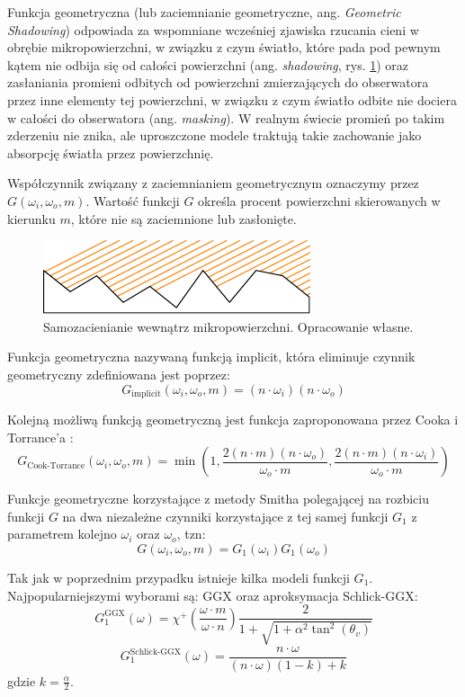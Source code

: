 \documentclass[../main.tex]{subfiles}
\begin{document}
Funkcja geometryczna (lub zaciemnianie geometryczne, ang. \textit{Geometric
Shadowing}) odpowiada za wspomniane wcześniej zjawiska rzucania cieni w obrębie
mikropowierzchni, w związku z czym światło, które pada pod pewnym kątem nie
odbija się od całości powierzchni (ang. \textit{shadowing}, rys.
\ref{fig:GeometricShadowing}) oraz zasłaniania promieni odbitych od powierzchni
zmierzających do obserwatora przez inne elementy tej powierzchni, w związku z
czym światło odbite nie dociera w całości do obserwatora (ang.
\textit{masking}). W realnym świecie promień po takim zderzeniu nie znika, ale
uproszczone modele traktują takie zachowanie jako absorpcję światła przez
powierzchnię.

Współczynnik związany z zaciemnianiem geometrycznym oznaczymy przez $G(\omega_i,\omega_o,m)$.
Wartość funkcji $G$ określa procent powierzchni skierowanych w kierunku
$m$, które nie są zaciemnione lub zasłonięte.

\begin{figure}[h]
  \centering
  \includegraphics{illustrations/pbr/geometry_shadowing.pdf}
  \vspace{0.25cm}
  \caption{Samozacienianie wewnątrz mikropowierzchni. Opracowanie własne.}
  \label{fig:GeometricShadowing}
\end{figure}

Funkcja geometryczna nazywaną funkcją implicit, która eliminuje czynnik geometryczny zdefiniowana jest poprzez:
\[
  G_{\text{implicit}}(\omega_i, \omega_o, m) =
    (n \cdot \omega_i) (n \cdot \omega_o)
\]

Kolejną możliwą funkcją geometryczną jest funkcja zaproponowana przez Cooka i Torrance'a \cite{CookTorrance}:
\[
  G_{\text{Cook-Torrance}}(\omega_i,\omega_o,m) =
    \min \left(
      1,
      \frac{2(n \cdot m)(n \cdot \omega_o)}{
        \omega_o \cdot m
      },
      \frac{2(n \cdot m)(n \cdot \omega_i)}{
        \omega_o \cdot m
      }
    \right)
\]

Funkcje geometryczne korzystające z metody Smitha polegającej na rozbiciu
funkcji $G$ na dwa niezależne czynniki korzystające z tej samej funkcji $G_1$
z parametrem kolejno $\omega_i$ oraz $\omega_o$, tzn:
\[
  G(\omega_i, \omega_o, m) = G_1(\omega_i) G_1(\omega_o)
\]

Tak jak w poprzednim przypadku istnieje kilka modeli funkcji $G_1$.
Najpopularniejszymi wyborami są: GGX \cite{WalterMicrofacetModels} oraz aproksymacja Schlick-GGX:
\[
  G_{1}^{\text{GGX}}(\omega) =
    \chi^{+}\left(\frac{\omega \cdot m}{\omega \cdot n}\right)
    \frac{2}{
      1 + \sqrt{
        1 + \alpha^2 \tan^{2}\left(\theta_v\right)
      }
    }
\]
\[
  G_{1}^{\text{Schlick-GGX}}(\omega) =
    \frac{n \cdot \omega}{
      (n \cdot \omega)(1 - k) + k
    }
\]
\noindent gdzie $k = \frac{\alpha}{2}$.
\end{document}
